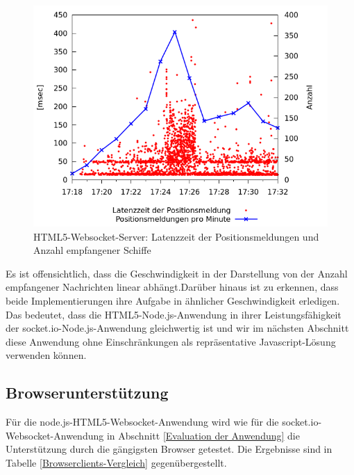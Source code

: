 \begin {figure}[H]
\begin{center}
  \includegraphics[width=4.5in]{images/latency_timeReceived_HTML5.png}
\end{center}
\caption{HTML5-Websocket-Server: Latenzzeit der Positionsmeldungen und Anzahl empfangener Schiffe}
\label {Latenzzeit HTML5}
\end {figure}
Es ist offensichtlich, dass die Geschwindigkeit in der Darstellung von der Anzahl empfangener Nachrichten linear abhängt.Darüber hinaus ist zu erkennen, dass beide Implementierungen ihre Aufgabe in ähnlicher Geschwindigkeit erledigen.
Das bedeutet, dass die HTML5-Node.js-Anwendung in ihrer Leistungsfähigkeit der socket.io-Node.js-Anwendung gleichwertig ist und wir im nächsten Abschnitt diese Anwendung ohne Einschränkungen als repräsentative Javascript-Lösung verwenden können.

\subsection{Browserunterstützung}
Für die  node.js-HTML5-Websocket-Anwendung wird wie für die socket.io-Websocket-Anwendung in Abschnitt \ref{Evaluation der Anwendung} die Unterstützung durch die gängigsten Browser getestet. Die Ergebnisse sind in Tabelle \ref{Browserclients-Vergleich} gegenübergestellt.

